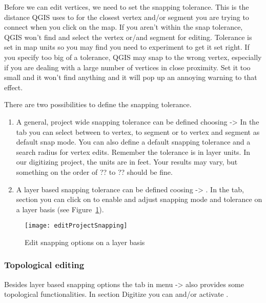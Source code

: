 Before we can edit vertices, we need to set the snapping tolerance. This is the 
distance QGIS uses to  for the closest vertex and/or segment you 
are trying to connect when you click on the map. If you aren't within the snap tolerance,
QGIS won't find and select the vertex or/and segment for editing. Tolerance is set in map
units so you may find you need to experiment to get it set right. If you
specify too big of a tolerance, QGIS may snap to the wrong vertex, especially if you are 
dealing with a large number of vertices in close proximity. Set it too small and it won't 
find anything and it will pop up an annoying warning to that effect. 

There are two possibilities to define the snapping tolerance. 

\begin{enumerate}
\item A general, project wide snapping tolerance can be defined choosing  ->  
In the  tab you can select between to vertex, to segment or to vertex and segment 
as default snap mode. You can also define a default snapping tolerance and a search radius for 
vertex edits. Remember the tolerance is in layer units. In our digitizing project, the units are 
in feet. Your results may vary, but something on the order of ?? to ?? should be fine.
\item A layer based snapping tolerance can be defined coosing  -> 
. In the  tab, section 
 you can click on  to enable and adjust snapping 
mode and tolerance on a layer basis (see Figure~\ref{fig:snappingoptions}).
\end{enumerate}

\begin{figure}[H]
   \begin{center}
   \caption{Edit snapping options on a layer basis \nixcaption}\label{fig:snappingoptions}\smallskip
   \texttt{[image: editProjectSnapping]} 
\end{center}  
\end{figure}

\subsubsection{Topological editing}

Besides layer based snapping options the  tab in menu  ->  also provides some topological functionalities. 
In section Digitize you can  and/or activate 
.

